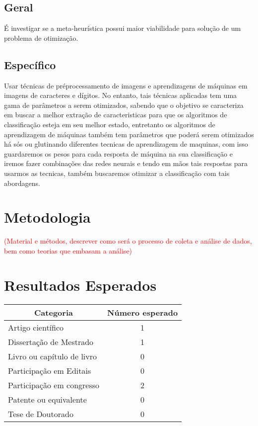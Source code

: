 \documentclass[12pt,a4paper,oneside]{book}
\newcommand\wb[1]{\discretionary{#1}{#1}{#1}}
\begin{document}
\section{Geral}
\'{E} investigar se a meta-heur\'{i}stica possui maior viabilidade para solu\c{c}\~{a}o de um problema de otimiza\c{c}\~{a}o.
\section{Espec\'{i}fico}
Usar t\'{e}cnicas de pr\'{e}\wb-processamento de imagens e aprendizagens de m\'{a}quinas em imagens de caracteres e d\'{i}gitos. No entanto, tais t\'{e}cnicas aplicadas tem uma gama de par\^{a}metros a serem otimizados, sabendo que o objetivo se caracteriza em buscar a melhor extra\c{c}\~{a}o de caracteristicas para que os algoritmos de classifica\c{c}\~{a}o esteja em seu melhor estado, entretanto os algoritmos de aprendizagem de m\'{a}quinas tamb\'{e}m tem par\^{a}metros que poder\'{a} serem otimizados h\'{a} s\'{o}s ou glutinando diferentes tecnicas de aprendizagem de maquinas, com isso guardaremos os pesos para cada resposta de m\'{a}quina na sua classifica\c{c}\~{a}o e iremos fazer combina\c{c}\~{o}es das redes neurais e tendo em m\~{a}os tais respostas para usarmos as tecnicas, tamb\'{e}m buscaremos otimizar a classifica\c{c}\~{a}o com tais abordagens.


\pagebreak

\chapter{Metodologia}
\textcolor{red}{(Material e m\'{e}todos, descrever como ser\'{a} o processo de coleta e an\'{a}lise de dados, bem como teorias que embasam a an\'{a}lise)}
\pagebreak

\chapter{Resultados Esperados}
\begin{center}
    \begin{tabular}{|l|c|}
        \hline
        \multicolumn{1}{|c|}{Categoria} & \multicolumn{1}{|c|}{N\'{u}mero esperado} \\ \hline
        Artigo cient\'{i}fico & 1 \\ \hline
        Disserta\c{c}\~{a}o de Mestrado & 1 \\ \hline
        Livro ou cap\'{i}tulo de livro & 0 \\ \hline
        Participa\c{c}\~{a}o em Editais & 0 \\ \hline
        Participa\c{c}\~{a}o em congresso & 2 \\ \hline
        Patente ou equivalente & 0 \\ \hline
        Tese de Doutorado & 0 \\ \hline
    \end{tabular}
\end{center}
\pagebreak
\end{document}
